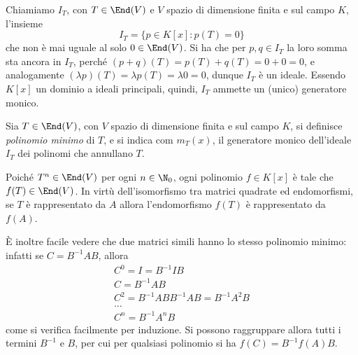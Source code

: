 Chiamiamo $I_T$, con  $T\in \End(V)$ e $V$ spazio di dimensione finita e sul campo $K$, l'insieme
\begin{equation*}
	I_T = \{ p\in K[x]\colon p(T) = 0 \}
\end{equation*}
che non è mai uguale al solo $0\in \End(V)$.
Si ha che per $p,q\in I_T$ la loro somma sta ancora in $I_T$, perch\'e $(p+q)(T)=p(T)+q(T)=0+0=0$, e analogamente $(\lambda p)(T)=\lambda p(T)=\lambda 0=0$, dunque $I_T$ è un ideale.
Essendo $K[x]$ un dominio a ideali principali, quindi, $I_T$ ammette un (unico) generatore monico.
\begin{definizione} \label{d:polinomio-minimo}
	Sia $T\in \End(V)$, con $V$ spazio di dimensione finita e sul campo $K$, si definisce \emph{polinomio minimo} di $T$, e si indica com $m_T(x)$, il generatore monico dell'ideale $I_T$ dei polinomi che annullano $T$.
\end{definizione}
Poich\'e $T^n\in\End(V)$ per ogni $n\in\N_0$, ogni polinomio $f\in K[x]$ è tale che $f(T)\in\End(V)$.
In virtù dell'isomorfismo tra matrici quadrate ed endomorfismi, se $T$ è rappresentato da $A$ allora l'endomorfismo $f(T)$ è rappresentato da $f(A)$.

È inoltre facile vedere che due matrici simili hanno lo stesso polinomio minimo: infatti se $C=B^{-1}AB$, allora
\begin{gather*}
	C^0=I=B^{-1}IB\\
	C=B^{-1}AB\\
	C^2=B^{-1}ABB^{-1}AB=B^{-1}A^2B\\
	\dots\\
	C^n=B^{-1}A^nB
\end{gather*}
come si verifica facilmente per induzione.
Si possono raggruppare allora tutti i termini $B^{-1}$ e $B$, per cui per qualsiasi polinomio si ha $f(C)=B^{-1}f(A)B$.

